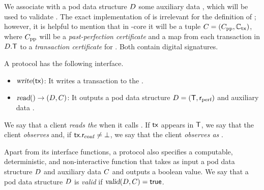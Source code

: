 \begin{definition}
    We associate with a pod data structure $D$ some auxiliary data \cert, which will be used to validate \Pod.
    The exact implementation of \cert is irrelevant for the definition of \podtm;
    however, it is helpful to mention that in \podtm-core it will be a tuple $C = (C_\text{pp}, \mathbb{C}_\text{tx})$,
    where $C_\text{pp}$ will be a \emph{past-perfection certificate} and \alltxcert a map from each transaction \tx in $D.\textsf{T}$ to a \emph{transaction certificate} \txcert for \tx.
    Both contain digital signatures.
\end{definition}

\begin{definition}\label{def:podinterface}
A \podtm protocol has the following interface.
\begin{itemize}
    \item $\textsl{write}(\textsf{tx})$:
    It writes a transaction \tx to the \podtm.

    \item $\textsl{read}() \rightarrow (D, C)$:
    It outputs a pod data structure $D = (\textsf{T}, \textsf{r}_\text{perf})$ and auxiliary data \cert.
\end{itemize}
\end{definition}
We say that a client \emph{reads the} \podtm when it calls \opread{}.
If $\textsf{tx}$ appears in $\textsf{T}$,
 we say that the client \emph{observes} \tx and, if $\textsf{tx}.\textsf{r}_\text{conf} \neq \bot$, we say that the client \emph{observes \tx as \confirmed}.

\begin{definition}
    Apart from its interface functions,
    a \podtm protocol also specifies a computable, deterministic, and non-interactive function \opValid{\Pod, \cert} that takes as input a pod data structure $D$ and auxiliary data $C$ and outputs a boolean value. We say that a pod data structure $D$ is \emph{valid} if $\textsl{valid}(D, C) = \mathsf{true}$.
\end{definition}



